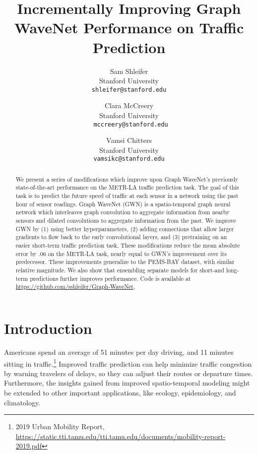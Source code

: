 \documentclass[10pt]{article}
\begin{document}
\title{\vspace{-3.5cm}Incrementally Improving Graph WaveNet Performance on Traffic Prediction}

\author{
Sam Shleifer\\
Stanford University\\
{\tt\small shleifer@stanford.edu}
\and
Clara McCreery\\
Stanford University \\
{\tt\small 
mccreery@stanford.edu}
\and
Vamsi Chitters\\
Stanford University\\
{\tt\small vamsikc@stanford.edu}
}
\maketitle

\begin{abstract}
    We present a series of modifications which improve upon Graph WaveNet's previously state-of-the-art performance on the METR-LA traffic prediction task. The goal of this task is to predict the future speed of traffic at each sensor in a network using the past hour of sensor readings. Graph WaveNet (GWN) is a spatio-temporal graph neural network which interleaves graph convolution to aggregate information from nearby sensors and dilated convolutions to aggregate information from the past. We improve GWN by (1) using better hyperparameters, (2) adding connections that allow larger gradients to flow back to the early convolutional layers, and (3) pretraining on an easier short-term traffic prediction task. These modifications reduce the mean absolute error by .06 on the METR-LA task, nearly equal to GWN's improvement over its predecessor. These improvements generalize to the PEMS-BAY dataset,  with similar relative magnitude. We also show that ensembling separate models for short-and long-term predictions further improves performance. Code is available at \url{https://github.com/sshleifer/Graph-WaveNet}.
\end{abstract}

\section{Introduction}
Americans spend an average of 51 minutes per day driving, and 11 minutes sitting in traffic.\footnote{2019 Urban Mobility Report, \url{https://static.tti.tamu.edu/tti.tamu.edu/documents/mobility-report-2019.pdf}} Improved traffic prediction can help minimize traffic congestion by warning travelers of delays, so they can adjust their routes or departure times. Furthermore, the insights gained from improved spatio-temporal modeling might be extended to other important applications, like ecology, epidemiology, and climatology.
\end{document}
